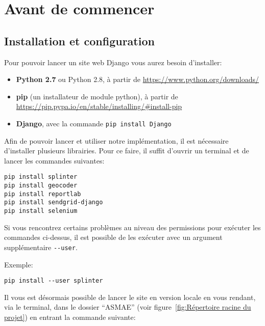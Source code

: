 \chapter{Avant de commencer}

\section{Installation et configuration}
\label{sec:Installation et configuration}

Pour pouvoir lancer un site web Django vous aurez besoin d'installer: \newline

\begin{itemize}
    \item \textbf{Python 2.7} ou Python 2.8, à partir de
    \url{https://www.python.org/downloads/}
    \item \textbf{pip} (un installateur de module python), à partir de
    \url{https://pip.pypa.io/en/stable/installing/#install-pip}
    \item \textbf{Django}, avec la commande \verb#pip install Django#\\
\end{itemize}

Afin de pouvoir lancer et utiliser notre implémentation, il est nécessaire
d’installer plusieurs librairies. Pour ce faire, il suffit d’ouvrir un terminal
et de lancer les commandes suivantes: \newline

\begin{verbatim}
pip install splinter
pip install geocoder
pip install reportlab
pip install sendgrid-django
pip install selenium
\end{verbatim}

Si vous rencontrez certains problèmes au niveau des permissions pour exécuter
les commandes ci-dessus, il est possible de les exécuter avec un argument
supplémentaire \verb#--user#. \newline

\begin{framed}
Exemple: \newline

\verb#pip install --user splinter#
\end{framed}

Il vous est désormais possible de lancer le site en version locale en vous
rendant, via le terminal, dans le dossier \enquote{ASMAE} (voir
figure~\ref{fig:Répertoire racine du projet}) en entrant la commande suivante: \newline


